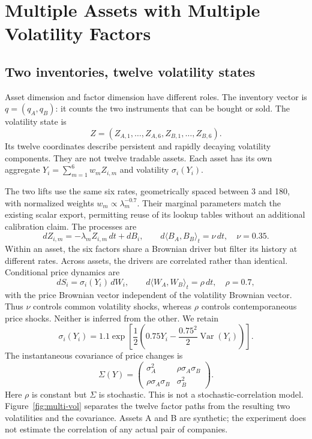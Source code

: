 \chapter{Multiple Assets with Multiple Volatility Factors}

\section{Two inventories, twelve volatility states}
Asset dimension and factor dimension have different roles. The inventory vector is $q=(q_A,q_B)$: it counts the two instruments that can be bought or sold. The volatility state is
\[
 Z=(Z_{A,1},\ldots,Z_{A,6},Z_{B,1},\ldots,Z_{B,6}).
\]
Its twelve coordinates describe persistent and rapidly decaying volatility components. They are not twelve tradable assets. Each asset has its own aggregate $Y_i=\sum_{m=1}^6w_mZ_{i,m}$ and volatility $\sigma_i(Y_i)$.

The two lifts use the same six rates, geometrically spaced between 3 and 180, with normalized weights $w_m\propto\lambda_m^{-0.7}$. Their marginal parameters match the existing scalar export, permitting reuse of its lookup tables without an additional calibration claim. The processes are
\[
 dZ_{i,m}=-\lambda_m Z_{i,m}\,dt+dB_i,
 \qquad d\langle B_A,B_B\rangle_t=\nu\,dt,\quad \nu=0.35.
\]
Within an asset, the six factors share a Brownian driver but filter its history at different rates. Across assets, the drivers are correlated rather than identical. Conditional price dynamics are
\[
 dS_i=\sigma_i(Y_i)\,dW_i,\qquad
 d\langle W_A,W_B\rangle_t=\rho\,dt,\quad \rho=0.7,
\]
with the price Brownian vector independent of the volatility Brownian vector. Thus $\nu$ controls common volatility shocks, whereas $\rho$ controls contemporaneous price shocks. Neither is inferred from the other. We retain
\[
 \sigma_i(Y_i)=1.1\exp\!\left[\frac12\left(0.75Y_i-
 \frac{0.75^2}{2}\operatorname{Var}(Y_i)\right)\right].
\]
The instantaneous covariance of price changes is
\[
 \Sigma(Y)=\begin{pmatrix}
 \sigma_A^2 & \rho\sigma_A\sigma_B\\
 \rho\sigma_A\sigma_B & \sigma_B^2
 \end{pmatrix}.
\]
Here $\rho$ is constant but $\Sigma$ is stochastic. This is not a stochastic-correlation model. Figure~\ref{fig:multi-vol} separates the twelve factor paths from the resulting two volatilities and the covariance. Assets A and B are synthetic; the experiment does not estimate the correlation of any actual pair of companies.


